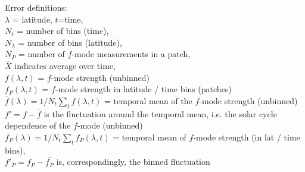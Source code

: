 \documentclass{aa}
\begin{document}
Error definitions:\\
$\lambda$ = latitude, $t$=time, \\
$N_t$ = number of bins (time), \\
$N_\lambda$ = number of bins (latitude), \\
$N_P$ = number of $f$-mode measurements in a patch, \\
$\overline{X}$ indicates average over time, \\
$f(\lambda,t)$ = $f$-mode strength (unbinned)\\
$f_P(\lambda,t)$ = $f$-mode strength in latitude / time bins (patches)\\
$\overline{f}(\lambda) = 1/N_t \sum_t f(\lambda,t)$ = temporal mean of the $f$-mode strength (unbinned)\\ 
$f'=f-\overline{f}$ is the fluctuation around the temporal mean, i.e. the solar cycle dependence of the $f$-mode (unbinned)\\
$\overline{f_P}(\lambda) = 1/N_t \sum_t f_P(\lambda,t)$ = 
temporal mean of 
$f$-mode strength (in lat / time bins), \\
$f'_P=f_P-\overline{f_P}$ is, correspondingly, the binned fluctuation\\
\end{document}
